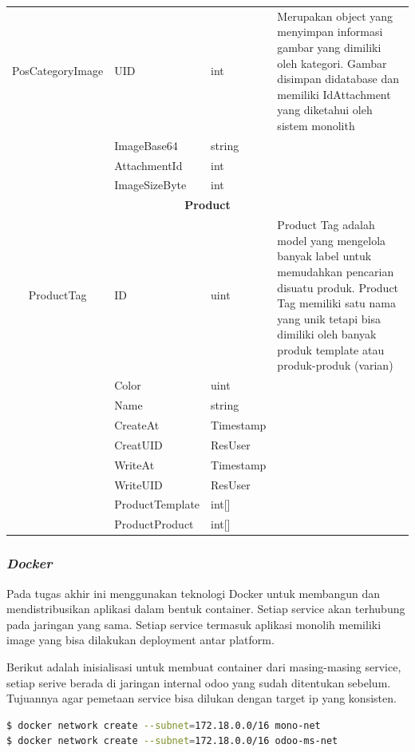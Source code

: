 \begin{longtable}{|c|p{3cm}|p{3cm}|p{4cm}|}
	\hline
	PosCategoryImage & UID & int & Merupakan object yang menyimpan informasi gambar yang dimiliki oleh kategori. Gambar disimpan didatabase dan memiliki IdAttachment yang diketahui oleh sistem monolith\\
	\cline{2-3}
	& ImageBase64 & string & \\
	\cline{2-3}
	& AttachmentId & int & \\
	\cline{2-3}
	& ImageSizeByte & int & \\
	\hline

	\multicolumn{4}{|c|}{\textbf{Product}} \\
	\hline
	ProductTag & ID & uint & Product Tag adalah model yang mengelola banyak label untuk memudahkan pencarian disuatu  produk. Product Tag memiliki satu nama yang unik tetapi bisa dimiliki oleh banyak produk template atau produk-produk (varian) \\
	\cline{2-3}
	& Color & uint & \\
	\cline{2-3}
	& Name & string & \\
	\cline{2-3}
	& CreateAt & Timestamp & \\
	\cline{2-3}
	& CreatUID & ResUser & \\
	\cline{2-3}
	& WriteAt & Timestamp & \\
	\cline{2-3}
	& WriteUID & ResUser & \\
	\cline{2-3}
	& ProductTemplate & int[] & \\
	\cline{2-3}
	& ProductProduct & int[] & \\
	\hline
\end{longtable}



\subsubsection{\textit{Docker} }
Pada tugas akhir ini menggunakan teknologi Docker untuk membangun dan mendistribusikan aplikasi dalam bentuk container. Setiap service akan terhubung pada jaringan yang sama. Setiap service termasuk aplikasi monolih memiliki image yang bisa dilakukan deployment antar platform. 

Berikut adalah inisialisasi untuk membuat container dari masing-masing service, setiap serive berada di jaringan internal odoo yang sudah ditentukan sebelum. Tujuannya agar pemetaan service bisa dilukan dengan target ip yang konsisten.

\begin{lstlisting}[style=mystyle, language=sh, caption={Shell Script untuk pembuatan jaringan }]
$ docker network create --subnet=172.18.0.0/16 mono-net
$ docker network create --subnet=172.18.0.0/16 odoo-ms-net	
\end{lstlisting} 

